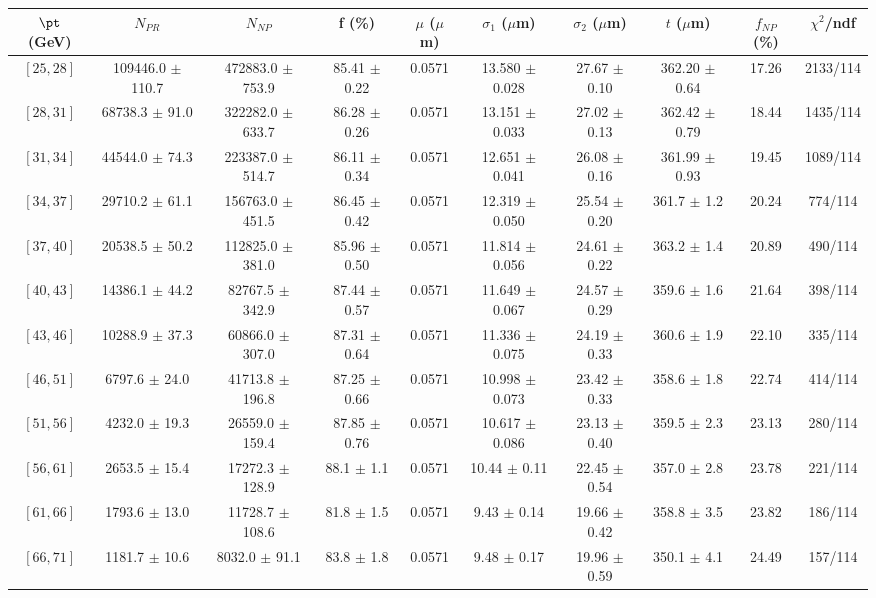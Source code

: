 \begin{tabular}{c||c|c|c|c|c|c|c||c|c}
$\pt$ (GeV) & $N_{PR}$ & $N_{NP}$ & f (\%) & $\mu$ ($\mu$m) & $\sigma_1$ ($\mu$m) & $\sigma_2$ ($\mu$m)  & $t$ ($\mu$m) & $f_{NP}$ (\%) & $\chi^2$/ndf \\
\hline
$[25, 28]$ & 109446.0 $\pm$ 110.7 & 472883.0 $\pm$ 753.9 & 85.41 $\pm$ 0.22 & 0.0571 & 13.580 $\pm$ 0.028 & 27.67 $\pm$ 0.10 & 362.20 $\pm$ 0.64 & 17.26 & 2133/114\\
$[28, 31]$ & 68738.3 $\pm$ 91.0 & 322282.0 $\pm$ 633.7 & 86.28 $\pm$ 0.26 & 0.0571 & 13.151 $\pm$ 0.033 & 27.02 $\pm$ 0.13 & 362.42 $\pm$ 0.79 & 18.44 & 1435/114\\
$[31, 34]$ & 44544.0 $\pm$ 74.3 & 223387.0 $\pm$ 514.7 & 86.11 $\pm$ 0.34 & 0.0571 & 12.651 $\pm$ 0.041 & 26.08 $\pm$ 0.16 & 361.99 $\pm$ 0.93 & 19.45 & 1089/114\\
$[34, 37]$ & 29710.2 $\pm$ 61.1 & 156763.0 $\pm$ 451.5 & 86.45 $\pm$ 0.42 & 0.0571 & 12.319 $\pm$ 0.050 & 25.54 $\pm$ 0.20 & 361.7 $\pm$ 1.2 & 20.24 & 774/114\\
$[37, 40]$ & 20538.5 $\pm$ 50.2 & 112825.0 $\pm$ 381.0 & 85.96 $\pm$ 0.50 & 0.0571 & 11.814 $\pm$ 0.056 & 24.61 $\pm$ 0.22 & 363.2 $\pm$ 1.4 & 20.89 & 490/114\\
$[40, 43]$ & 14386.1 $\pm$ 44.2 & 82767.5 $\pm$ 342.9 & 87.44 $\pm$ 0.57 & 0.0571 & 11.649 $\pm$ 0.067 & 24.57 $\pm$ 0.29 & 359.6 $\pm$ 1.6 & 21.64 & 398/114\\
$[43, 46]$ & 10288.9 $\pm$ 37.3 & 60866.0 $\pm$ 307.0 & 87.31 $\pm$ 0.64 & 0.0571 & 11.336 $\pm$ 0.075 & 24.19 $\pm$ 0.33 & 360.6 $\pm$ 1.9 & 22.10 & 335/114\\
$[46, 51]$ & 6797.6 $\pm$ 24.0 & 41713.8 $\pm$ 196.8 & 87.25 $\pm$ 0.66 & 0.0571 & 10.998 $\pm$ 0.073 & 23.42 $\pm$ 0.33 & 358.6 $\pm$ 1.8 & 22.74 & 414/114\\
$[51, 56]$ & 4232.0 $\pm$ 19.3 & 26559.0 $\pm$ 159.4 & 87.85 $\pm$ 0.76 & 0.0571 & 10.617 $\pm$ 0.086 & 23.13 $\pm$ 0.40 & 359.5 $\pm$ 2.3 & 23.13 & 280/114\\
$[56, 61]$ & 2653.5 $\pm$ 15.4 & 17272.3 $\pm$ 128.9 & 88.1 $\pm$ 1.1 & 0.0571 & 10.44 $\pm$ 0.11 & 22.45 $\pm$ 0.54 & 357.0 $\pm$ 2.8 & 23.78 & 221/114\\
$[61, 66]$ & 1793.6 $\pm$ 13.0 & 11728.7 $\pm$ 108.6 & 81.8 $\pm$ 1.5 & 0.0571 & 9.43 $\pm$ 0.14 & 19.66 $\pm$ 0.42 & 358.8 $\pm$ 3.5 & 23.82 & 186/114\\
$[66, 71]$ & 1181.7 $\pm$ 10.6 & 8032.0 $\pm$ 91.1 & 83.8 $\pm$ 1.8 & 0.0571 & 9.48 $\pm$ 0.17 & 19.96 $\pm$ 0.59 & 350.1 $\pm$ 4.1 & 24.49 & 157/114\\

\end{tabular}
